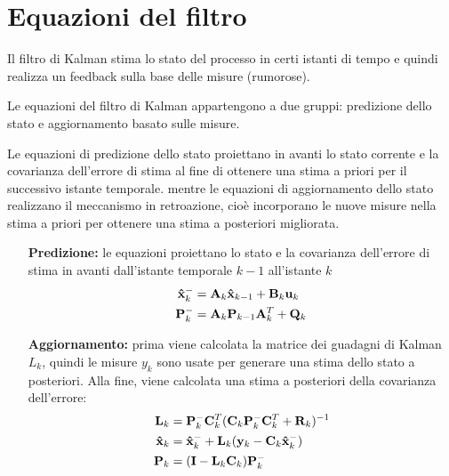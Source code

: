 \section{Equazioni del filtro}

Il filtro di Kalman stima lo stato del processo in certi istanti di tempo e quindi realizza un feedback sulla base delle misure (rumorose).

Le equazioni del filtro di Kalman appartengono a due gruppi:
predizione dello stato e aggiornamento basato sulle misure.

Le equazioni di predizione dello stato proiettano in avanti lo stato corrente e la covarianza dell’errore di stima al fine di ottenere una stima a priori per il successivo istante temporale.
mentre le equazioni di aggiornamento dello stato realizzano il meccanismo in retroazione, cioè incorporano le nuove misure nella stima a priori per ottenere una stima a posteriori migliorata.

\begin{itemize}
\item[\textbf{Predizione:}]le equazioni proiettano lo stato e la covarianza dell’errore di stima in avanti dall’istante temporale $k-1$ all’istante $k$ 
\begin{align*}
\mathbf{\hat{x}}_k^- &= \mathbf{A}_k\mathbf{\hat{x}}_{k-1} + \mathbf{B}_k\mathbf{u}_k \\
\mathbf{P}_k^- &= \mathbf{A}_k\mathbf{P}_{k-1}\mathbf{A}_k^T + \mathbf{Q}_k
\end{align*}

\item[\textbf{Aggiornamento:}] prima viene calcolata la matrice dei guadagni di Kalman $L_k$, quindi le misure $y_k$ sono usate per generare una stima dello stato a posteriori. Alla fine, viene calcolata una stima a posteriori della covarianza dell’errore:
\begin{align*}
\mathbf{L}_k &= \mathbf{P}_k^-\mathbf{C}_k^T(\mathbf{C}_k\mathbf{P}_k^-\mathbf{C}_k^T + \mathbf{R}_k)^{-1}\\
\mathbf{\hat{x}}_k &= \mathbf{\hat{x}}_k^- + \mathbf{L}_k(\mathbf{y}_k - \mathbf{C}_k\mathbf{\hat{x}}_k^-)\\
\mathbf{P}_k &= (\mathbf{I} - \mathbf{L}_k\mathbf{C}_k)\mathbf{P}_k^-
\end{align*}

\end{itemize}
\newpage